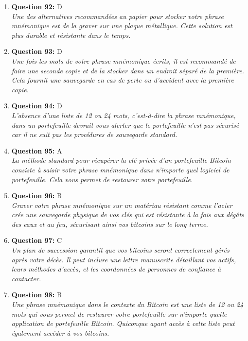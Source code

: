 \documentclass[12pt,a4paper]{article}
\begin{document}
\begin{enumerate}
\item \textbf{Question 92:} D
\\ \textit{Une des alternatives recommandées au papier pour stocker votre phrase mnémonique est de la graver sur une plaque métallique. Cette solution est plus durable et résistante dans le temps.}

\item \textbf{Question 93:} D
\\ \textit{Une fois les mots de votre phrase mnémonique écrits, il est recommandé de faire une seconde copie et de la stocker dans un endroit séparé de la première. Cela fournit une sauvegarde en cas de perte ou d'accident avec la première copie.}

\item \textbf{Question 94:} D
\\ \textit{L'absence d'une liste de 12 ou 24 mots, c'est-à-dire la phrase mnémonique, dans un portefeuille devrait vous alerter que le portefeuille n'est pas sécurisé car il ne suit pas les procédures de sauvegarde standard.}

\item \textbf{Question 95:} A
\\ \textit{La méthode standard pour récupérer la clé privée d'un portefeuille Bitcoin consiste à saisir votre phrase mnémonique dans n'importe quel logiciel de portefeuille. Cela vous permet de restaurer votre portefeuille.}

\item \textbf{Question 96:} B
\\ \textit{Graver votre phrase mnémonique sur un matériau résistant comme l'acier crée une sauvegarde physique de vos clés qui est résistante à la fois aux dégâts des eaux et au feu, sécurisant ainsi vos bitcoins sur le long terme.}

\item \textbf{Question 97:} C
\\ \textit{Un plan de succession garantit que vos bitcoins seront correctement gérés après votre décès. Il peut inclure une lettre manuscrite détaillant vos actifs, leurs méthodes d'accès, et les coordonnées de personnes de confiance à contacter.}

\item \textbf{Question 98:} B
\\ \textit{Une phrase mnémonique dans le contexte du Bitcoin est une liste de 12 ou 24 mots qui vous permet de restaurer votre portefeuille sur n'importe quelle application de portefeuille Bitcoin. Quiconque ayant accès à cette liste peut également accéder à vos bitcoins.}


\end{enumerate}
\end{document}
